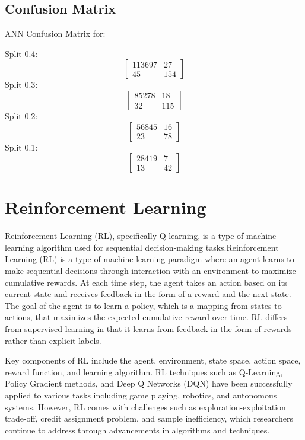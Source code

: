\documentclass[12pt,a4paper]{report}
\begin{document}
\section{Confusion Matrix}
ANN Confusion Matrix for: \par
 \vspace{0.5cm}

Split 0.4:
\[
\begin{bmatrix}
  113697 & 27\\
  45 & 154
\end{bmatrix}
\]
 \vspace{0.5cm}
Split 0.3:
\[
\begin{bmatrix}
  85278 & 18\\
  32 & 115
\end{bmatrix}
\]
Split 0.2:
 \vspace{0.5cm}
\[
\begin{bmatrix}
  56845 & 16\\
  23 & 78
\end{bmatrix}
\]
Split 0.1:
 \vspace{0.5cm}
\[
\begin{bmatrix}
  28419 & 7\\
  13 & 42
\end{bmatrix}
\]


\chapter{Reinforcement Learning}
Reinforcement Learning (RL), specifically Q-learning, is a type of machine learning algorithm used for sequential decision-making tasks.Reinforcement Learning (RL) is a type of machine learning paradigm where an agent learns to make sequential decisions through interaction with an environment to maximize cumulative rewards. At each time step, the agent takes an action based on its current state and receives feedback in the form of a reward and the next state. The goal of the agent is to learn a policy, which is a mapping from states to actions, that maximizes the expected cumulative reward over time. RL differs from supervised learning in that it learns from feedback in the form of rewards rather than explicit labels.\par 
Key components of RL include the agent, environment, state space, action space, reward function, and learning algorithm. RL techniques such as Q-Learning, Policy Gradient methods, and Deep Q Networks (DQN) have been successfully applied to various tasks including game playing, robotics, and autonomous systems. However, RL comes with challenges such as exploration-exploitation trade-off, credit assignment problem, and sample inefficiency, which researchers continue to address through advancements in algorithms and techniques.
\end{document}
